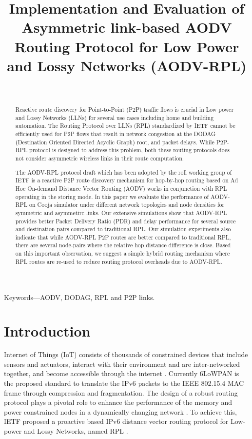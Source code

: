 \documentclass[conference, letterpaper]{IEEEtran}
\title{ Implementation and Evaluation of Asymmetric link-based AODV
Routing Protocol for Low Power and Lossy Networks (AODV-RPL)}
\author{ \IEEEauthorblockN{Lavanya HM, Anand S V R, Malati Hegde} \
\IEEEauthorblockA{ECE Department, Indian Institute of Science \\ \{lavanyahm,
anandsvr, malati\}@iisc.ac.in} }
\begin{document}
\maketitle
\begin{abstract}

Reactive route discovery for Point-to-Point (P2P) traffic flows is crucial in
Low power and Lossy Networks (LLNs) for several use cases including home and
building automation. The Routing Protocol over LLNs (RPL) standardized by IETF
cannot be efficiently used for P2P flows that result in network congestion at
the DODAG (Destination Oriented Directed Acyclic Graph) root, and packet delays.
While P2P-RPL protocol is designed to address this problem, both these routing
protocols does not consider asymmetric wireless links in their route
computation.

The AODV-RPL protocol draft which has been adopted by the roll working group of
IETF is a reactive P2P route discovery mechanism for hop-by-hop routing based on
Ad Hoc On-demand Distance Vector Routing (AODV) works in conjunction with RPL
operating in the storing mode. In this paper we evaluate the performance of
AODV-RPL on Cooja simulator under different network topologies and node
densities for symmetric and asymmetirc links. Our extensive simulations show
that AODV-RPL provides better Packet Delivery Ratio (PDR) and delay performance
for several source and destination pairs compared to traditional RPL. Our
simulation experiments also indicate that while AODV-RPL P2P routes are better
compared to traditional RPL, there are several node-pairs where the relative hop
distance difference is close. Based on this important observation, we suggest a
simple hybrid routing mechanism where RPL routes are re-used to reduce routing
protocol overheads due to AODV-RPL.



\end{abstract}

Keywords—AODV, DODAG, RPL and P2P links.  \section{Introduction}

Internet of Things (IoT) consists of thousands of constrained devices that
include sensors and actuators, interact with their environment and are
inter-networked together, and become accessible through the internet
\cite{iot,industry,iotservey}.  Currently 6LoWPAN \cite{iotstack} is the
proposed standard to translate the IPv6 packets to the IEEE 802.15.4 MAC frame
through compression and fragmentation. The design of a robust routing protocol
plays a pivotal role to enhance the performance of the memory and power
constrained nodes in a dynamically changing network \cite{lowpan}. To achieve
this, IETF proposed a proactive based IPv6 distance vector routing protocol for
Low-power and Lossy Networks, named RPL \cite{RFC6550}.
\end{document}
